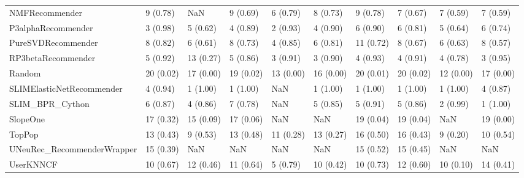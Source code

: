 \begin{tabular}{llllllllll}
                     NMFRecommender &                 9 (0.78) &         NaN &      9 (0.69) &     6 (0.79) &             8 (0.73) &            9 (0.78) &          7 (0.67) &           7 (0.59) &          7 (0.59) \\
                 P3alphaRecommender &                 3 (0.98) &    5 (0.62) &      4 (0.89) &     2 (0.93) &             4 (0.90) &            6 (0.90) &          6 (0.81) &           5 (0.64) &          6 (0.74) \\
                 PureSVDRecommender &                 8 (0.82) &    6 (0.61) &      8 (0.73) &     4 (0.85) &             6 (0.81) &           11 (0.72) &          8 (0.67) &           6 (0.63) &          8 (0.57) \\
                 RP3betaRecommender &                 5 (0.92) &   13 (0.27) &      5 (0.86) &     3 (0.91) &             3 (0.90) &            4 (0.93) &          4 (0.91) &           4 (0.78) &          3 (0.95) \\
                             Random &                20 (0.02) &   17 (0.00) &     19 (0.02) &    13 (0.00) &            16 (0.00) &           20 (0.01) &         20 (0.02) &          12 (0.00) &         17 (0.00) \\
          SLIMElasticNetRecommender &                 4 (0.94) &    1 (1.00) &      1 (1.00) &          NaN &             1 (1.00) &            1 (1.00) &          1 (1.00) &           1 (1.00) &          4 (0.87) \\
                    SLIM\_BPR\_Cython &                 6 (0.87) &    4 (0.86) &      7 (0.78) &          NaN &             5 (0.85) &            5 (0.91) &          5 (0.86) &           2 (0.99) &          1 (1.00) \\
                           SlopeOne &                17 (0.32) &   15 (0.09) &     17 (0.06) &          NaN &                  NaN &           19 (0.04) &         19 (0.04) &                NaN &         19 (0.00) \\
                             TopPop &                13 (0.43) &    9 (0.53) &     13 (0.48) &    11 (0.28) &            13 (0.27) &           16 (0.50) &         16 (0.43) &           9 (0.20) &         10 (0.54) \\
         UNeuRec\_RecommenderWrapper &                15 (0.39) &         NaN &           NaN &          NaN &                  NaN &           15 (0.52) &         15 (0.45) &                NaN &               NaN \\
                          UserKNNCF &                10 (0.67) &   12 (0.46) &     11 (0.64) &     5 (0.79) &            10 (0.42) &           10 (0.73) &         12 (0.60) &          10 (0.10) &         14 (0.41) \\
\bottomrule
\end{tabular}
